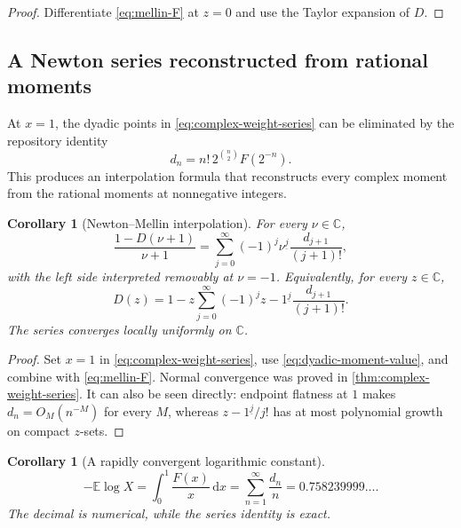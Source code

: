 \documentclass[11pt,oneside]{article}
\newtheorem{corollary}[theorem]{Corollary}
\theoremstyle{definition}
\theoremstyle{remark}
\newcommand{\C}{\mathbb C}
\newcommand{\E}{\mathbb E}
\newcommand{\dd}{\,\mathrm d}
\newcommand{\falling}[2]{#1^{\underline{#2}}}
\begin{document}
\begin{proof}
Differentiate \eqref{eq:mellin-F} at $z=0$ and use the Taylor expansion of $D$.
\end{proof}

\subsection{A Newton series reconstructed from rational moments}

At $x=1$, the dyadic points in \eqref{eq:complex-weight-series} can be eliminated by the repository identity
\begin{equation}\label{eq:dyadic-moment-value}
 d_n=n!\,2^{\binom n2}F(2^{-n}).
\end{equation}
This produces an interpolation formula that reconstructs every complex moment from the rational moments at nonnegative integers.

\begin{corollary}[Newton--Mellin interpolation]\label{cor:newton-mellin}
For every $\nu\in\C$,
\begin{equation}\label{eq:newton-MF}
 \frac{1-D(\nu+1)}{\nu+1}
 =\sum_{j=0}^{\infty}(-1)^j\falling{\nu}{j}
 \frac{d_{j+1}}{(j+1)!},
\end{equation}
with the left side interpreted removably at $\nu=-1$.  Equivalently, for every $z\in\C$,
\begin{equation}\label{eq:newton-D}
\boxed{
 D(z)=1-z\sum_{j=0}^{\infty}(-1)^j
 \falling{z-1}{j}\frac{d_{j+1}}{(j+1)!}.}
\end{equation}
The series converges locally uniformly on $\C$.
\end{corollary}

\begin{proof}
Set $x=1$ in \eqref{eq:complex-weight-series}, use \eqref{eq:dyadic-moment-value}, and combine with \eqref{eq:mellin-F}.  Normal convergence was proved in \cref{thm:complex-weight-series}.  It can also be seen directly: endpoint flatness at $1$ makes $d_n=O_M(n^{-M})$ for every $M$, whereas $\falling{z-1}{j}/j!$ has at most polynomial growth on compact $z$-sets.
\end{proof}

\begin{corollary}[A rapidly convergent logarithmic constant]\label{cor:log-constant-series}
\begin{equation}\label{eq:log-constant-series}
 -\E\log X
 =\int_0^1\frac{F(x)}x\dd x
 =\sum_{n=1}^{\infty}\frac{d_n}{n}
 =0.758239999\ldots .
\end{equation}
The decimal is numerical, while the series identity is exact.
\end{corollary}
\end{document}
